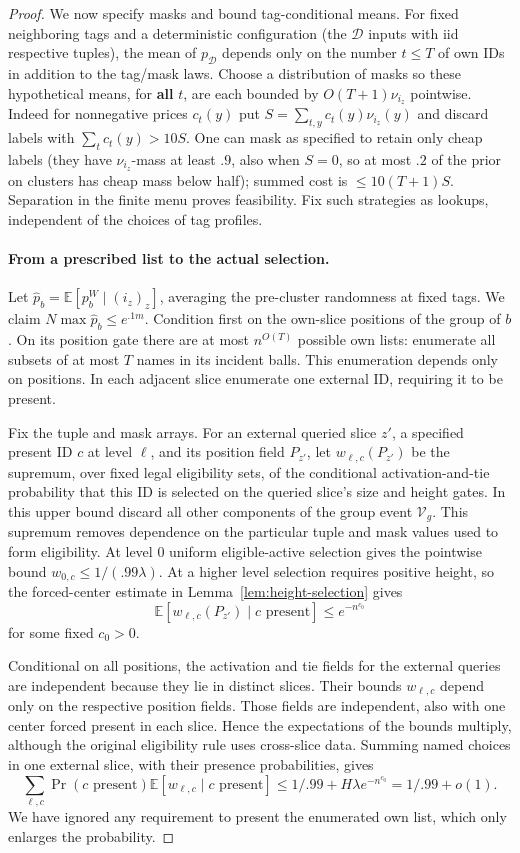 \begin{proof}
We now specify masks and bound tag-conditional means. For fixed neighboring tags and a deterministic configuration (the \(\mathcal D\) inputs with iid respective tuples), the mean of \(p_{\mathcal D}\) depends only on the number \(t\le T\) of own IDs in addition to the tag/mask laws. Choose a distribution of masks so these hypothetical means, for \textbf{all} \(t\), are each bounded by \(O(T+1)\nu_{i_z}\) pointwise. Indeed for nonnegative prices \(c_t(y)\) put \(S=\sum_{t,y}c_t(y)\nu_{i_z}(y)\) and discard labels with \(\sum_t c_t(y)>10S\). One can mask as specified to retain only cheap labels (they have \(\nu_{i_z}\)-mass at least \(.9\), also when \(S=0\), so at most \(.2\) of the prior on clusters has cheap mass below half); summed cost is \(\le 10(T+1)S\). Separation in the finite menu proves feasibility. Fix such strategies as lookups, independent of the choices of tag profiles.

\paragraph{From a prescribed list to the actual selection.}
Let \(\widehat p_b=\mathbb E[p_b^W\mid(i_z)_z]\), averaging the pre-cluster randomness at fixed tags. We claim
\(N\max\widehat p_b\le e^{.1m}\).
Condition first on the own-slice positions of the group of \(b\). On its position gate there are at most \(n^{O(T)}\) possible own lists: enumerate all subsets of at most \(T\) names in its incident balls. This enumeration depends only on positions. In each adjacent slice enumerate one external ID, requiring it to be present.

Fix the tuple and mask arrays. For an external queried slice \(z'\), a specified present ID \(c\) at level \(\ell\), and its position field \(P_{z'}\), let \(w_{\ell,c}(P_{z'})\) be the supremum, over fixed legal eligibility sets, of the conditional activation-and-tie probability that this ID is selected on the queried slice's size and height gates. In this upper bound discard all other components of the group event \(\mathcal V_g\). This supremum removes dependence on the particular tuple and mask values used to form eligibility. At level 0 uniform eligible-active selection gives the pointwise bound
\(w_{0,c}\le1/(.99\lambda)\).
At a higher level selection requires positive height, so the forced-center estimate in Lemma~\ref{lem:height-selection} gives
\[
 \mathbb E[w_{\ell,c}(P_{z'})\mid c\text{ present}]
       \le e^{-n^{c_0}}
\]
for some fixed \(c_0>0\).

Conditional on all positions, the activation and tie fields for the external queries are independent because they lie in distinct slices. Their bounds \(w_{\ell,c}\) depend only on the respective position fields. Those fields are independent, also with one center forced present in each slice. Hence the expectations of the bounds multiply, although the original eligibility rule uses cross-slice data. Summing named choices in one external slice, with their presence probabilities, gives
\[
 \sum_{\ell,c}\Pr(c\text{ present})
       \mathbb E[w_{\ell,c}\mid c\text{ present}]
 \le 1/.99+H\lambda e^{-n^{c_0}}=1/.99+o(1).
\]
We have ignored any requirement to present the enumerated own list, which only enlarges the probability.


\end{proof}
